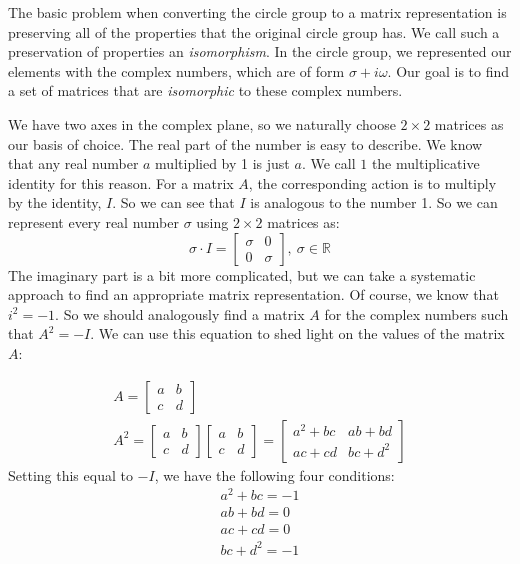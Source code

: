 The basic problem when converting the circle group to a matrix representation is preserving all of the properties that the original circle group has. We call such a preservation of properties an \textit{isomorphism}. In the circle group, we represented our elements with the complex numbers, which are of form $\sigma+i\omega$. Our goal is to find a set of matrices that are \textit{isomorphic} to these complex numbers.

We have two axes in the complex plane, so we naturally choose $2\times2$ matrices as our basis of choice. The real part of the number is easy to describe. We know that any real number $a$ multiplied by 1 is just $a$. We call $1$ the multiplicative identity for this reason. For a matrix $A$, the corresponding action is to multiply by the identity, $I$. So we can see that $I$ is analogous to the number 1. So we can represent every real number $\sigma$ using $2\times 2$ matrices as: $$\sigma\cdot I=\begin{bmatrix}
    \sigma&0\\0&\sigma
\end{bmatrix},\ \sigma\in\mathbb{R}$$
The imaginary part is a bit more complicated, but we can take a systematic approach to find an appropriate matrix representation. Of course, we know that $i^2=-1$. So we should analogously find a matrix $A$ for the complex numbers such that $A^2=-I$. We can use this equation to shed light on the values of the matrix $A$:

\begin{gather}
    A=\begin{bmatrix}
    a&b\\c&d
\end{bmatrix}\\
A^2=\begin{bmatrix}
    a&b\\c&d
\end{bmatrix}\begin{bmatrix}
    a&b\\c&d
\end{bmatrix}=\begin{bmatrix}
    a^2+bc&ab+bd\\ac+cd&bc+d^2
\end{bmatrix}
\end{gather}
Setting this equal to $-I$, we have the following four conditions:
\begin{gather}
    a^2+bc=-1\\
    ab+bd=0\\
    ac+cd=0\\
    bc+d^2=-1
\end{gather}

